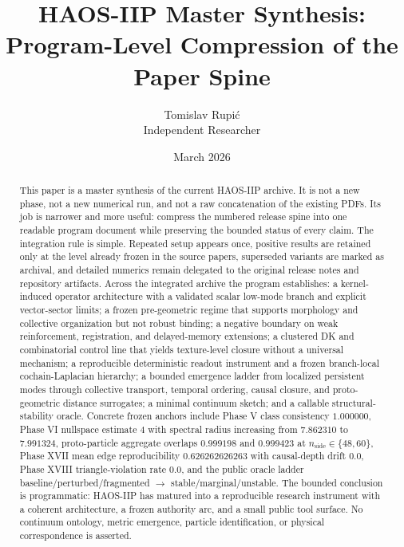 \documentclass[11pt]{article}
\title{HAOS-IIP Master Synthesis: Program-Level Compression of the Paper Spine}
\author{Tomislav Rupi\'c \\ Independent Researcher}
\date{March 2026}
\begin{document}
\maketitle

\begin{abstract}
This paper is a master synthesis of the current HAOS-IIP archive. It is not a new phase, not a new numerical run, and not a raw concatenation of the existing PDFs. Its job is narrower and more useful: compress the numbered release spine into one readable program document while preserving the bounded status of every claim. The integration rule is simple. Repeated setup appears once, positive results are retained only at the level already frozen in the source papers, superseded variants are marked as archival, and detailed numerics remain delegated to the original release notes and repository artifacts. Across the integrated archive the program establishes: a kernel-induced operator architecture with a validated scalar low-mode branch and explicit vector-sector limits; a frozen pre-geometric regime that supports morphology and collective organization but not robust binding; a negative boundary on weak reinforcement, registration, and delayed-memory extensions; a clustered DK and combinatorial control line that yields texture-level closure without a universal mechanism; a reproducible deterministic readout instrument and a frozen branch-local cochain-Laplacian hierarchy; a bounded emergence ladder from localized persistent modes through collective transport, temporal ordering, causal closure, and proto-geometric distance surrogates; a minimal continuum sketch; and a callable structural-stability oracle. Concrete frozen anchors include Phase V class consistency $1.000000$, Phase VI nullspace estimate $4$ with spectral radius increasing from $7.862310$ to $7.991324$, proto-particle aggregate overlaps $0.999198$ and $0.999423$ at $n_{\mathrm{side}} \in \{48,60\}$, Phase XVII mean edge reproducibility $0.626262626263$ with causal-depth drift $0.0$, Phase XVIII triangle-violation rate $0.0$, and the public oracle ladder baseline/perturbed/fragmented $\to$ stable/marginal/unstable. The bounded conclusion is programmatic: HAOS-IIP has matured into a reproducible research instrument with a coherent architecture, a frozen authority arc, and a small public tool surface. No continuum ontology, metric emergence, particle identification, or physical correspondence is asserted.
\end{abstract}

\tableofcontents
\end{document}
